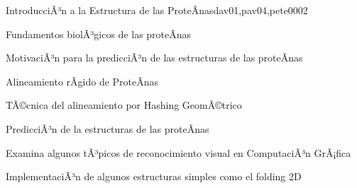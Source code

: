 \begin{syllabus}
\begin{unit}{IntroducciÃ³n a la Estructura de las ProteÃ­nas}{dav01,pav04,pete00}{0}{2}
\begin{topics}
        \item Fundamentos biolÃ³gicos de las proteÃ­nas
        \item MotivaciÃ³n para la predicciÃ³n de las estructuras de las proteÃ­nas
        \item Alineamiento rÃ­gido de ProteÃ­nas
        \item TÃ©cnica del alineamiento por Hashing GeomÃ©trico
        \item PredicciÃ³n de la estructuras de las proteÃ­nas
    \end{topics}

    \begin{unitgoals}
        \item Examina algunos tÃ³picos de reconocimiento visual en ComputaciÃ³n GrÃ¡fica
        \item ImplementaciÃ³n de algunos estructuras simples como el folding 2D
    \end{unitgoals}
\end{unit}



\begin{coursebibliography}
\end{coursebibliography}

\end{syllabus}
